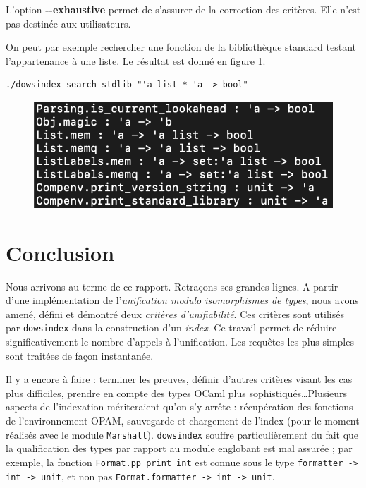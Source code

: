 \documentclass[a4paper]{report}
\theoremstyle{definition}
\newcommand{\dowsindex}{\texttt{dowsindex}\xspace}
\begin{document}
L'option \textbf{-{}-exhaustive} permet de s'assurer de la correction des critères. Elle n'est pas destinée aux utilisateurs.

On peut par exemple rechercher une fonction de la bibliothèque standard testant l'appartenance à une liste. Le résultat est donné en figure \ref{fig_dowsindex_search}.

\begin{verbatim}
./dowsindex search stdlib "'a list * 'a -> bool"
\end{verbatim}

\begin{figure}[h]
	\begin{center}
		\includegraphics[scale=0.25]{images/dowsindex-search}
	\end{center}
	\caption{\label{fig_dowsindex_search}}
\end{figure}


\chapter{Conclusion}

Nous arrivons au terme de ce rapport. Retraçons ses grandes lignes. A partir d'une implémentation de l'\emph{unification modulo isomorphismes de types}, nous avons amené, défini et démontré deux \emph{critères d'unifiabilité}. Ces critères sont utilisés par \dowsindex dans la construction d'un \emph{index}. Ce travail permet de réduire significativement le nombre d'appels à l'unification. Les requêtes les plus simples sont traitées de façon instantanée.

Il y a encore à faire : terminer les preuves, définir d'autres critères visant les cas plus difficiles, prendre en compte des types OCaml plus sophistiqués\dots Plusieurs aspects de l'indexation mériteraient qu'on s'y arrête : récupération des fonctions de l'environnement OPAM, sauvegarde et chargement de l'index (pour le moment réalisés avec le module \texttt{Marshall}). \dowsindex souffre particulièrement du fait que la qualification des types par rapport au module englobant est mal assurée ; par exemple, la fonction \texttt{Format.pp_print_int} est connue sous le type \texttt{formatter -> int -> unit}, et non pas \texttt{Format.formatter -> int -> unit}.
\end{document}
